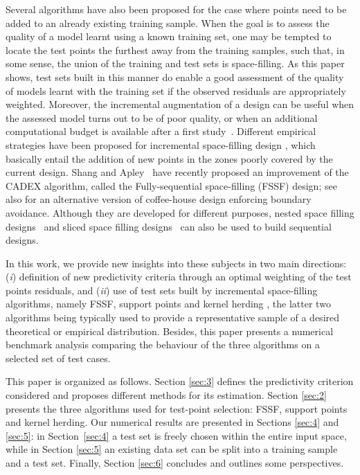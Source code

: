Several algorithms have also been proposed for the case where points need to be added to an already existing training sample. 
When the goal is to  assess the quality of a model learnt using a known training set, one may be tempted to locate the test points the furthest away from the training samples, such that, in some sense, the union of the training and test sets is space-filling. 
As this paper shows, test sets built in this manner do enable a good assessment of the quality of models learnt with the training set if the observed residuals are appropriately weighted. 
Moreover, the incremental augmentation of a design can be useful when the assessed model turns out to be of poor quality, or when an additional computational budget is available after a first study~\cite{sheraz17,shaapl21}. 
Different empirical strategies have been proposed for incremental space-filling design \cite{ioobou10,crolae11,lilu17}, which basically entail the addition of new points in the zones poorly covered by the current design. 
Shang and Apley~\cite{shaapl21} have recently proposed an improvement of the CADEX algorithm, called the Fully-sequential space-filling (FSSF) design; see also \cite{NogalesPR2021} for an alternative version of coffee-house design enforcing boundary avoidance. 
Although they are developed for different purposes, nested space filling designs~\cite{qiaai09} and sliced space filling designs~\cite{qiawu09} can also be used to build sequential designs. 


In this work, we provide new insights into these subjects in two main directions: (\textit{i}) definition of new predictivity criteria through an optimal weighting of the test points residuals, and (\textit{ii}) use of test sets built by incremental space-filling algorithms, namely FSSF, support points \cite{makjos18} and kernel herding \cite{chewel10}, the latter two algorithms being typically used to provide a representative sample of a desired theoretical or empirical distribution. 
Besides, this paper presents a numerical benchmark analysis comparing the behaviour of the three algorithms on a selected set of test cases.

This paper is organized as follows. 
Section \ref{sec:3} defines the predictivity criterion considered and proposes different methods for its estimation. 
Section \ref{sec:2} presents the three algorithms used for test-point selection: FSSF, support points and kernel herding. 
Our numerical results are presented in Sections \ref{sec:4} and \ref{sec:5}: in Section~\ref{sec:4} a test set is freely chosen within the entire input space, while in Section \ref{sec:5} an existing data set can be split into a training sample and a test set. 
Finally, Section \ref{sec:6} concludes and outlines some perspectives.




